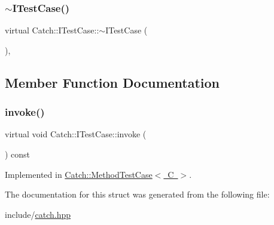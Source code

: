 \subsubsection{\texorpdfstring{$\sim$\+I\+Test\+Case()}{~ITestCase()}}
{\footnotesize\ttfamily virtual Catch\+::\+I\+Test\+Case\+::$\sim$\+I\+Test\+Case (\begin{DoxyParamCaption}{ }\end{DoxyParamCaption})\hspace{0.3cm}{\ttfamily [protected]}, {\ttfamily [virtual]}}



\subsection{Member Function Documentation}
\mbox{\label{struct_catch_1_1_i_test_case_a678825e62e7c17297621cfeb65588c34}} 
\subsubsection{\texorpdfstring{invoke()}{invoke()}}
{\footnotesize\ttfamily virtual void Catch\+::\+I\+Test\+Case\+::invoke (\begin{DoxyParamCaption}{ }\end{DoxyParamCaption}) const\hspace{0.3cm}{\ttfamily [pure virtual]}}



Implemented in \mbox{\hyperlink{class_catch_1_1_method_test_case_a4e2263cfa0646f2980768328cb372793}{Catch\+::\+Method\+Test\+Case$<$ C $>$}}.



The documentation for this struct was generated from the following file\+:\begin{DoxyCompactItemize}
\item 
include/\mbox{\hyperlink{catch_8hpp}{catch.\+hpp}}\end{DoxyCompactItemize}
